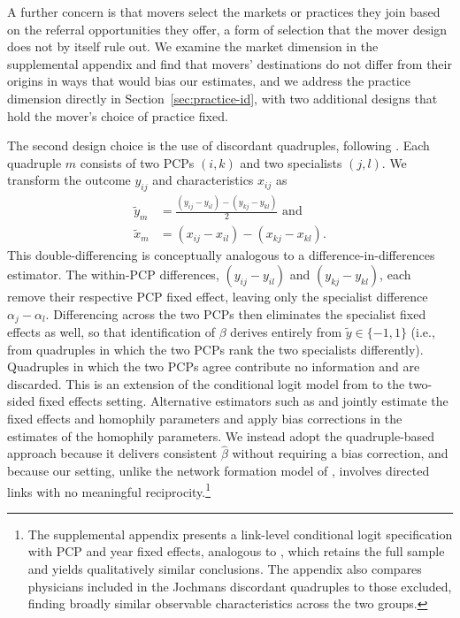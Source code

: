 \documentclass[12pt]{article}
\begin{document}
A further concern is that movers select the markets or practices they join based on the referral opportunities they offer, a form of selection that the mover design does not by itself rule out. We examine the market dimension in the supplemental appendix and find that movers' destinations do not differ from their origins in ways that would bias our estimates, and we address the practice dimension directly in Section~\ref{sec:practice-id}, with two additional designs that hold the mover's choice of practice fixed.

The second design choice is the use of discordant quadruples, following \cite{jochmans2018}. Each quadruple $m$ consists of two PCPs $(i, k)$ and two specialists $(j, l)$. We transform the outcome $y_{ij}$ and characteristics $x_{ij}$ as
\begin{align*}
    \tilde{y}_m & = \frac{(y_{ij} - y_{il}) - (y_{kj} - y_{kl})}{2} \text{ and} \\
    \tilde{x}_m & = (x_{ij} - x_{il}) - (x_{kj} - x_{kl}).
\end{align*}
This double-differencing is conceptually analogous to a difference-in-differences estimator. The within-PCP differences, $(y_{ij} - y_{il})$ and $(y_{kj} - y_{kl})$, each remove their respective PCP fixed effect, leaving only the specialist difference $\alpha_j - \alpha_l$. Differencing across the two PCPs then eliminates the specialist fixed effects as well, so that identification of $\beta$ derives entirely from $\tilde{y} \in \{-1, 1\}$ (i.e., from quadruples in which the two PCPs rank the two specialists differently). Quadruples in which the two PCPs agree contribute no information and are discarded. This is an extension of the conditional logit model from \cite{chamberlain_analysis_1980} to the two-sided fixed effects setting. Alternative estimators such as \cite{graham_econometric_2017} and \cite{dzemski2019} jointly estimate the fixed effects and homophily parameters and apply bias corrections in the estimates of the homophily parameters. We instead adopt the quadruple-based approach because it delivers consistent $\widehat{\beta}$ without requiring a bias correction, and because our setting, unlike the network formation model of \cite{dzemski2019}, involves directed links with no meaningful reciprocity.\footnote{The supplemental appendix presents a link-level conditional logit specification with PCP and year fixed effects, analogous to \citet{zeltzer2020}, which retains the full sample and yields qualitatively similar conclusions. The appendix also compares physicians included in the Jochmans discordant quadruples to those excluded, finding broadly similar observable characteristics across the two groups.}
\end{document}
